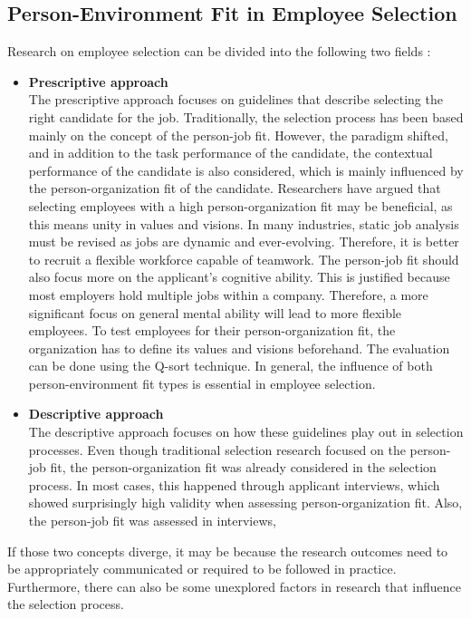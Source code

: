 \documentclass[draft,final]{thesisclass} %
\begin{document}
\subsection{Person-Environment Fit in Employee Selection}
Research on employee selection can be divided into the following two fields \parencite[185-186]{po_and_pj_fit_literature_review}:
\begin{itemize}
    \item \textbf{Prescriptive approach}\\
    The prescriptive approach focuses on guidelines that describe selecting the right candidate for the job.
    Traditionally, the selection process has been based mainly on the concept of the person-job fit.
    However, the paradigm shifted, and in addition to the task performance of the candidate, the contextual performance of the candidate is also considered, which is mainly influenced by the person-organization fit of the candidate.
    Researchers have argued that selecting employees with a high person-organization fit may be beneficial, as this means unity in values and visions.
    In many industries, static job analysis must be revised as jobs are dynamic and ever-evolving. Therefore, it is better to recruit a flexible workforce capable of teamwork.
    The person-job fit should also focus more on the applicant's cognitive ability. This is justified because most employers hold multiple jobs within a company. Therefore, a more significant focus on general mental ability will lead to more flexible employees.
    To test employees for their person-organization fit, the organization has to define its values and visions beforehand.
    The evaluation can be done using the Q-sort technique.
    In general, the influence of both person-environment fit types is essential in employee selection.
    \item \textbf{Descriptive approach}\\
    The descriptive approach focuses on how these guidelines play out in selection processes.
    Even though traditional selection research focused on the person-job fit, the person-organization fit was already considered in the selection process.
    In most cases, this happened through applicant interviews, which showed surprisingly high validity when assessing person-organization fit.
    Also, the person-job fit was assessed in interviews,
\end{itemize}
If those two concepts diverge, it may be because the research outcomes need to be appropriately communicated or required to be followed in practice.
Furthermore, there can also be some unexplored factors in research that influence the selection process.
\end{document}
